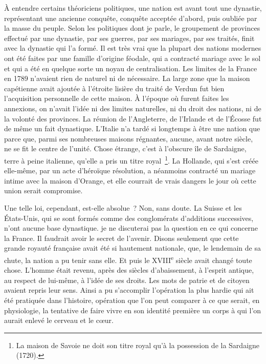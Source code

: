 \documentclass[french,twoside]{book} %
\newcommand\orgName[1]{#1}
\newcommand\placeName[1]{#1}
\newcommand\chaptercont{} %
\begin{document}
\chaptercont
\noindent À entendre certains théoriciens politiques, une nation est avant tout une dynastie, représentant une ancienne conquête, conquête acceptée d’abord, puis oubliée par la masse du peuple. Selon les politiques dont je parle, le groupement de provinces effectué par une dynastie, par ses guerres, par ses mariages, par ses traités, finit avec la dynastie qui l’a formé. Il est très vrai que la plupart des nations modernes ont été faites par une famille d’origine féodale, qui a contracté mariage avec le sol et qui a été en quelque sorte un noyau de centralisation. Les limites de la {\placeName France} en 1789 n’avaient rien de naturel ni de nécessaire. La large zone que la {\orgName maison capétienne} avait ajoutée à l’étroite lisière du traité de Verdun fut bien l’acquisition personnelle de cette maison. À l’époque où furent faites les annexions, on n’avait l’idée ni des limites naturelles, ni du droit des nations, ni de la volonté des provinces. La réunion de l’{\placeName Angleterre}, de l’{\placeName Irlande} et de l’{\placeName Écosse} fut de même un fait dynastique. L’{\placeName Italie} n’a tardé si longtemps à être une nation que parce que, parmi ses nombreuses maisons régnantes, aucune, avant notre siècle, ne se fit le centre de l’unité. Chose étrange, c’est à l’obscure île de {\placeName Sardaigne}, terre à peine italienne, qu’elle a pris un titre royal \footnote{La {\orgName maison de Savoie} ne doit son titre royal qu’à la possession de la {\placeName Sardaigne} (1720).}. La {\placeName Hollande}, qui s’est créée elle-même, par un acte d’héroïque résolution, a néanmoins contracté un mariage intime avec la {\orgName maison d’Orange}, et elle courrait de vrais dangers le jour où cette union serait compromise.\par
Une telle loi, cependant, est-elle absolue ? Non, sans doute. La {\placeName Suisse} et les {\placeName États-Unis}, qui se sont formés comme des conglomérats d’additions successives, n’ont aucune base dynastique. je ne discuterai pas la question en ce qui concerne la {\placeName France}. Il faudrait avoir le secret de l’avenir. Disons seulement que cette grande royauté française avait été si hautement nationale, que, le lendemain de sa chute, la nation a pu tenir sans elle. Et puis le XVIII\textsuperscript{e} siècle avait changé toute chose. L’homme était revenu, après des siècles d’abaissement, à l’esprit antique, au respect de lui-même, à l’idée de ses droits. Les mots de patrie et de citoyen avaient repris leur sens. Ainsi a pu s’accomplir l’opération la plus hardie qui ait été pratiquée dans l’histoire, opération que l’on peut comparer à ce que serait, en physiologie, la tentative de faire vivre en son identité première un corps à qui l’on aurait enlevé le cerveau et le cœur.\par
\end{document}
